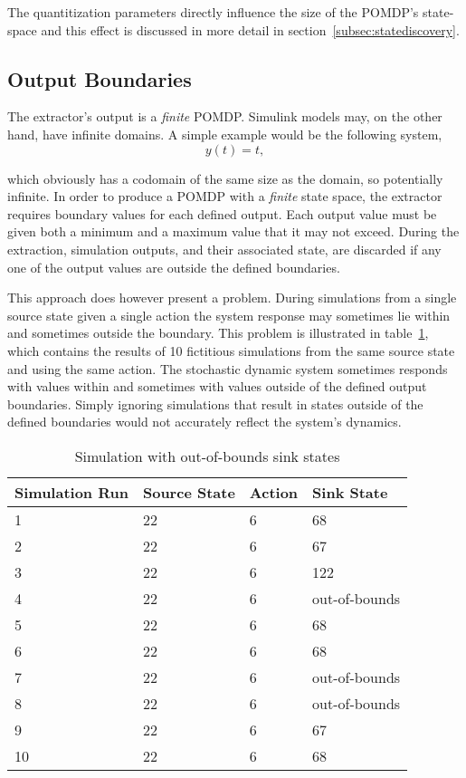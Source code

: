 The quantitization parameters directly influence the size of the POMDP's state-space and this effect is discussed in more detail in section~\ref{subsec:statediscovery}.

\subsection{Output Boundaries}
\label{subsec:outputboundaries}

The extractor's output is a \textit{finite} POMDP. Simulink models may, on the other hand, have infinite domains. A simple example would be the following system,
\[
y(t) = t,
\]

which obviously has a codomain of the same size as the domain, so potentially infinite. In order to produce a POMDP with a \textit{finite} state space, the extractor requires boundary values for each defined output. Each output value must be given both a minimum and a maximum value that it may not exceed. During the extraction, simulation outputs, and their associated state, are discarded if any one of the output values are outside the defined boundaries.

This approach does however present a problem. During simulations from a single source state given a single action the system response may sometimes lie within and sometimes outside the boundary. This problem is illustrated in table~\ref{outboundssim}, which contains the results of 10 fictitious simulations from the same source state and using the same action. The stochastic dynamic system sometimes responds with values within and sometimes with values outside of the defined output boundaries. Simply ignoring simulations that result in states outside of the defined boundaries would not accurately reflect the system's dynamics.

\begin{table}
\begin{center}
    \begin{tabular}{ | l | l | l | l |}
    \hline
    Simulation Run & Source State & Action & Sink State \\ \hline
    1 & 22 & 6 & 68 \\ \hline
    2 & 22 & 6 & 67 \\ \hline
    3 & 22 & 6 & 122 \\ \hline
    4 & 22 & 6 & out-of-bounds \\ \hline
    5 & 22 & 6 & 68 \\ \hline
    6 & 22 & 6 & 68 \\ \hline
    7 & 22 & 6 & out-of-bounds \\ \hline
    8 & 22 & 6 & out-of-bounds \\ \hline
    9 & 22 & 6 & 67 \\ \hline
    10 & 22 & 6 & 68 \\ \hline

    \end{tabular}
\caption{Simulation with out-of-bounds sink states}
\label{outboundssim}
\end{center}
\end{table}

